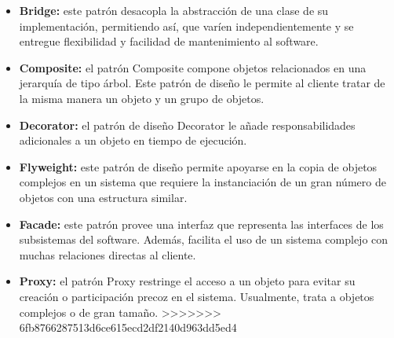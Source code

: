 \documentclass[twoside,twocolumn]{article}
\begin{document}
\begin{itemize}
\begin{itemize}
		\item \textbf{Bridge:} este patrón desacopla la abstracción de una clase de su implementación, permitiendo así, que varíen independientemente y se entregue flexibilidad y facilidad de mantenimiento al software.  
		\item \textbf{Composite:} el patrón Composite compone objetos relacionados en una jerarquía de tipo árbol. Este patrón de diseño le permite al cliente tratar de la misma manera un objeto y un grupo de objetos. 
		\item \textbf{Decorator:}	el patrón de diseño Decorator le añade responsabilidades adicionales a un objeto en tiempo de ejecución.  
		\item \textbf{Flyweight:}  este patrón de diseño permite apoyarse en la copia de objetos complejos en un sistema que requiere la instanciación de un gran número de objetos con una estructura similar.  
		\item \textbf{Facade:} este patrón provee una interfaz que representa las interfaces de los subsistemas del software. Además, facilita el uso de un sistema complejo con muchas relaciones directas al cliente.  
		\item \textbf{Proxy:} el patrón Proxy restringe el acceso a un objeto para evitar su creación o participación precoz en el sistema. Usualmente, trata a objetos complejos o de gran tamaño. 
>>>>>>> 6fb8766287513d6ce615ecd2df2140d963dd5ed4
        \\
        \\
    \end{itemize}


\end{itemize}
\end{document}
